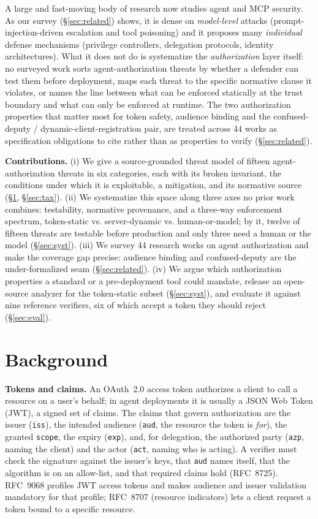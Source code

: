 A large and fast-moving body of research now studies agent and MCP security. As our
survey (\S\ref{sec:related}) shows, it is dense on \emph{model-level} attacks
(prompt-injection-driven escalation and tool poisoning) and it proposes many
\emph{individual} defense mechanisms (privilege controllers, delegation protocols,
identity architectures). What it does not do is systematize the \emph{authorization}
layer itself: no surveyed work sorts agent-authorization threats by whether a
defender can test them before deployment, maps each threat to the specific normative
clause it violates, or names the line between what can be enforced statically at the
trust boundary and what can only be enforced at runtime. The two authorization
properties that matter most for token safety, audience binding and the
confused-deputy / dynamic-client-registration pair, are treated across 44 works
as specification obligations to cite rather than as properties to verify
(\S\ref{sec:related}).

\noindent\textbf{Contributions.}
(i) We give a source-grounded threat model of fifteen agent-authorization threats in
six categories, each with its broken invariant, the conditions under which it is
exploitable, a mitigation, and its normative source (\S\ref{sec:background},
\S\ref{sec:tax}).
(ii) We systematize this space along three axes no prior work combines: testability,
normative provenance, and a three-way enforcement spectrum, token-static vs.
server-dynamic vs. human-or-model; by it, twelve of fifteen threats are testable
before production and only three need a human or the model (\S\ref{sec:syst}).
(iii) We survey 44 research works on agent authorization and make the coverage gap
precise: audience binding and confused-deputy are the under-formalized seam
(\S\ref{sec:related}).
(iv) We argue which authorization properties a standard or a pre-deployment tool
could mandate, release an open-source analyzer for the token-static subset
(\S\ref{sec:syst}), and evaluate it against nine reference verifiers, six of which
accept a token they should reject (\S\ref{sec:eval}).

\section{Background}\label{sec:background}
\noindent\textbf{Tokens and claims.} An OAuth~2.0 access token authorizes a client to
call a resource on a user's behalf; in agent deployments it is usually a JSON Web
Token (JWT), a signed set of claims. The claims that govern authorization are the
issuer (\texttt{iss}), the intended audience (\texttt{aud}, the resource the token is
\emph{for}), the granted \texttt{scope}, the expiry (\texttt{exp}), and, for
delegation, the authorized party (\texttt{azp}, naming the client) and the actor
(\texttt{act}, naming who is acting). A verifier must check the signature against the
issuer's keys, that \texttt{aud} names itself, that the algorithm is on an
allow-list, and that required claims hold (RFC~8725). RFC~9068 profiles JWT access
tokens and makes audience and issuer validation mandatory for that profile; RFC~8707
(resource indicators) lets a client request a token bound to a specific resource.

